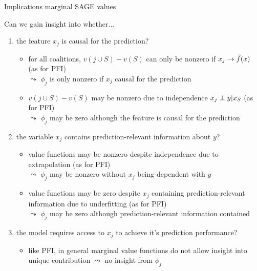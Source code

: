 \documentclass[11pt,compress,t,notes=noshow, aspectratio=169, xcolor=table]{beamer}
\begin{document}
\begin{frame}{Implications marginal SAGE values}

Can we gain insight into whether...

\begin{enumerate}
    \item<1> the feature $x_j$ is causal for the prediction?    \begin{itemize}
      \item for all coalitions, $v(j \cup S) - v(S)$ can only be nonzero if $x_j \rightarrow \fh(x)$ (as for PFI)\\
      $\leadsto$ $\phi_j$ is only nonzero if $x_j$ causal for the prediction
      \item $v(j \cup S) - v(S)$ may be nonzero due to independence $x_j \indep y | x_S$ (as for PFI)\\
      $\leadsto$ $\phi_j$ may be zero although the feature is causal for the prediction
    \end{itemize}
    \item<2> the variable $x_j$ contains prediction-relevant information about $y$?
    \begin{itemize}
      \item value functions may be nonzero despite independence due to extrapolation (as for PFI)\\
      $\leadsto$ $\phi_j$ may be nonzero without $x_j$ being dependent with $y$
      \item value functions may be zero despite $x_j$ containing prediction-relevant information due to underfitting (as for PFI)\\
      $\leadsto$ $\phi_j$ may be zero although prediction-relevant information contained
    \end{itemize}
    \item<3> the model requires access to $x_j$ to achieve it's prediction performance?    
    \begin{itemize}
      \item like PFI, in general marginal value functions do not allow insight into unique contribution $\leadsto$ no insight from $\phi_j$
    \end{itemize}
\end{enumerate}

\end{frame}
%
\end{document}
